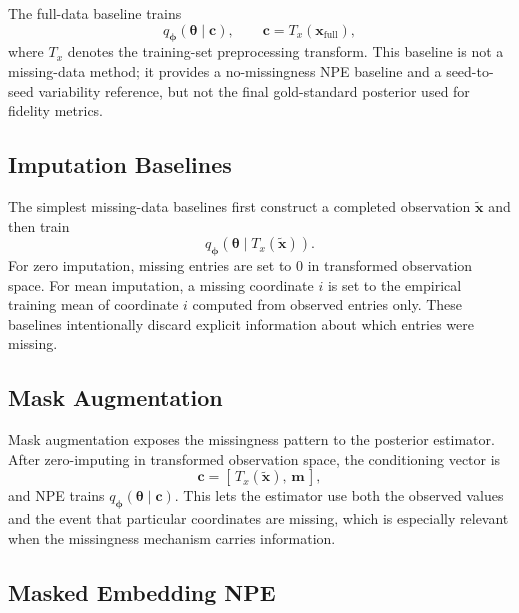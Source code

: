 \documentclass{article} %
\providecommand{\xfull}{\mathbf{x}_{\mathrm{full}}}
\providecommand{\xtilde}{\widetilde{\mathbf{x}}}
\providecommand{\mvec}{\mathbf{m}}
\providecommand{\thetab}{\boldsymbol{\theta}}
\providecommand{\phib}{\boldsymbol{\phi}}
\begin{document}
The full-data baseline trains
\begin{equation}
  q_{\phib}(\thetab \mid \mathbf{c}), \qquad \mathbf{c} = T_x(\xfull),
  \label{eq:full-data-npe}
\end{equation}
where $T_x$ denotes the training-set preprocessing transform. This baseline is
not a missing-data method; it provides a no-missingness NPE baseline and a
seed-to-seed variability reference, but not the final gold-standard posterior
used for fidelity metrics.

\subsection{Imputation Baselines}
\label{sec:method-imputation}

The simplest missing-data baselines first construct a completed observation
$\xtilde$ and then train
\begin{equation}
  q_{\phib}(\thetab \mid T_x(\xtilde)).
  \label{eq:imputation-npe}
\end{equation}
For zero imputation, missing entries are set to $0$ in transformed observation
space. For mean imputation, a missing coordinate $i$ is set to the empirical
training mean of coordinate $i$ computed from observed entries only. These
baselines intentionally discard explicit information about which entries were
missing.

\subsection{Mask Augmentation}
\label{sec:method-mask-augmentation}

Mask augmentation exposes the missingness pattern to the posterior estimator.
After zero-imputing in transformed observation space, the conditioning vector is
\begin{equation}
  \mathbf{c} = [\,T_x(\xtilde),\, \mvec\,],
  \label{eq:mask-augmentation}
\end{equation}
and NPE trains $q_{\phib}(\thetab \mid \mathbf{c})$. This lets the estimator use
both the observed values and the event that particular coordinates are missing,
which is especially relevant when the missingness mechanism carries information.

\subsection{Masked Embedding NPE}
\label{sec:method-masked-embedding}
\end{document}
